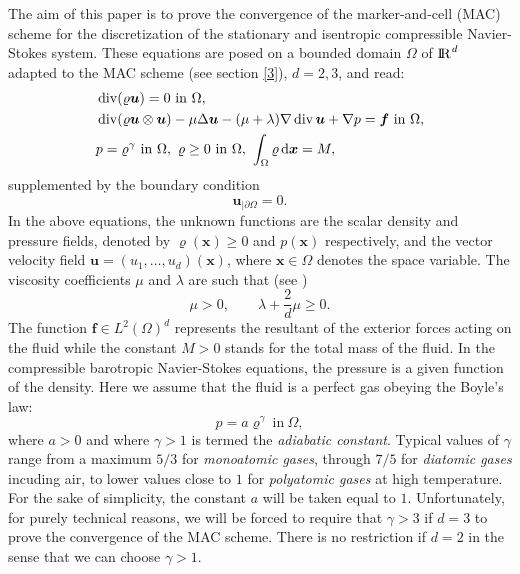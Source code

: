 \documentclass{amsart}
\numberwithin{equation}{section}
\begin{document}
The aim of this paper is to prove the convergence of the marker-and-cell (MAC) scheme for the discretization of the stationary and isentropic compressible Navier-Stokes system.
These equations are posed on a bounded domain $\Omega$ of ${\ifmmode{\rm	I\mkern-3.1mu
R\mkern1mu}\else{\rm I\kern-.18em 
R\hskip1pt\	}\fi\relax}^d$ adapted to the MAC scheme (see section \ref{3}), $d=2,3$, and read:
\begin{subequations}\label{pbcont_w}
	 \begin{align}
		&  \operatorname{div} ( {\varrho} {\bm{u}}) = 0 \ \text{in} \ \Omega,  \label{cont2} \\
		&\operatorname{div}({\varrho} {\bm{u}} \otimes {\bm{u}}) - \mu \Delta {\bm{u}}-(\mu+\lambda)\nabla \operatorname{div} {\bm{u}} +  \nabla p = \bm{f} \ \text{in} \ \Omega, \label{mov2} \\
                  & p={\varrho}^\gamma \ \text{in} \ \Omega, \ {\varrho} \ge 0 \ \text{in} \ \Omega, \ \int_\Omega {\varrho} {\, {\rm d}{{\boldsymbol x}}}=M, \label{EOS}
	\end{align}
	\label{pbcont}
\end{subequations}
supplemented by the boundary condition
\begin{equation}\label{ci2}
	{\bm{u}}_{|\partial \Omega} =0.
\end{equation}
In the above equations, the unknown functions are the scalar density and pressure fields, denoted by ${\varrho}({{\boldsymbol x}})\ge 0$ and $p({{\boldsymbol x}})$ respectively, and the vector velocity field ${\bm{u}}=(u_1,\ldots,u_d)({{\boldsymbol x}})$, where  ${{\boldsymbol x}}\in \Omega$ denotes the space variable. 
The viscosity coefficients $\mu$ and $\lambda$ are such that (see \cite{feireisl2004dynamics})
\begin{equation}\label{visc}
	\mu > 0, \qquad \lambda+ \frac {2}{d} \mu \ge 0.
\end{equation}
The function $\bm{f} \in L^2(\Omega)^d$ represents the resultant of the exterior forces acting on the fluid while the constant $ M > 0 $ stands for the total mass of the fluid.
In the compressible barotropic Navier-Stokes equations, the pressure is a given function of the density. Here we assume that the fluid is a perfect gas obeying the Boyle's law:
\begin{equation}\label{pressure1}
p = a {\varrho}^\gamma \ \text{in} \ \Omega,
\end{equation}
where $a>0$ and where $\gamma >1$ is termed the {\it{adiabatic constant}}. Typical values of $\gamma$  range from a maximum $5/3$ for {\it{monoatomic gases}}, through $7/5$ for {\it{diatomic gases}} incuding air, to lower values close to $1$ for {\it{polyatomic gases}} at high temperature. For the sake of simplicity, the constant $a$ will be taken equal to $1$. Unfortunately, for purely technical reasons, we will be forced to require that $\gamma >3$ if $d=3$ to prove the convergence of the MAC scheme. There is no restriction if $d=2$ in the sense that we can choose $\gamma >1$.
\end{document}

